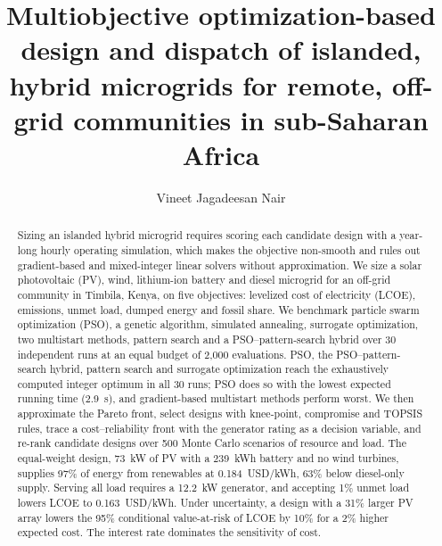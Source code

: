 \documentclass[final,3p,times]{elsarticle}
\begin{document}
\begin{frontmatter}

\title{Multiobjective optimization-based design and dispatch of islanded, hybrid microgrids for remote, off-grid communities in sub-Saharan Africa} %

\author[1]{Vineet Jagadeesan Nair} %


\begin{abstract}


Sizing an islanded hybrid microgrid requires scoring each candidate design with a year-long hourly operating simulation, which makes the objective non-smooth and rules out gradient-based and mixed-integer linear solvers without approximation. We size a solar photovoltaic (PV), wind, lithium-ion battery and diesel microgrid for an off-grid community in Timbila, Kenya, on five objectives: levelized cost of electricity (LCOE), emissions, unmet load, dumped energy and fossil share. We benchmark particle swarm optimization (PSO), a genetic algorithm, simulated annealing, surrogate optimization, two multistart methods, pattern search and a PSO--pattern-search hybrid over 30 independent runs at an equal budget of 2,000 evaluations. PSO, the PSO--pattern-search hybrid, pattern search and surrogate optimization reach the exhaustively computed integer optimum in all 30 runs; PSO does so with the lowest expected running time (2.9~s), and gradient-based multistart methods perform worst. We then approximate the Pareto front, select designs with knee-point, compromise and TOPSIS rules, trace a cost--reliability front with the generator rating as a decision variable, and re-rank candidate designs over 500 Monte Carlo scenarios of resource and load. The equal-weight design, 73~kW of PV with a 239~kWh battery and no wind turbines, supplies 97\% of energy from renewables at 0.184~USD/kWh, 63\% below diesel-only supply. Serving all load requires a 12.2~kW generator, and accepting 1\% unmet load lowers LCOE to 0.163~USD/kWh. Under uncertainty, a design with a 31\% larger PV array lowers the 95\% conditional value-at-risk of LCOE by 10\% for a 2\% higher expected cost. The interest rate dominates the sensitivity of cost.
\end{abstract}


\end{frontmatter}
\end{document}
